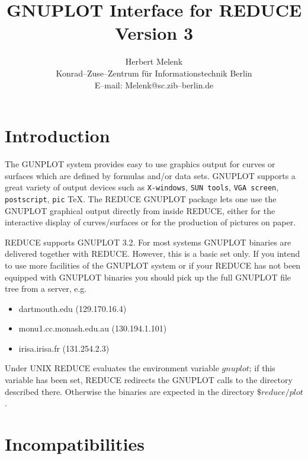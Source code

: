 \date{}
\title{GNUPLOT Interface for REDUCE\\Version 3}
\author{Herbert Melenk \\ 
Konrad--Zuse--Zentrum f\"ur Informationstechnik Berlin \\
E--mail: Melenk@sc.zib--berlin.de}

\maketitle

 
\section{Introduction}
The GUNPLOT system provides easy to use graphics output 
for curves or surfaces which are defined by  
formulas and/or data sets. GNUPLOT supports 
a great variety of output devices
such as \verb+X-windows+, \verb+SUN tools+, 
\verb+VGA screen+, \verb+postscript+, \verb+pic+ \TeX.
The {\small REDUCE} GNUPLOT package lets one use the GNUPLOT
graphical output directly from inside {\small REDUCE}, either for
the interactive display of curves/surfaces or for the production
of pictures on paper. 

{\small REDUCE} supports GNUPLOT 3.2. For most systems GNUPLOT binaries
are delivered together with {\small REDUCE}. However, this is a
basic set only. If you intend to use more facilities of the GNUPLOT
system or if your {\small REDUCE} has not been equipped with 
GNUPLOT binaries you should pick up the full GNUPLOT file tree
from a server, e.g.

\begin{itemize}
\item dartmouth.edu (129.170.16.4)
\item monu1.cc.monash.edu.au (130.194.1.101)
\item irisa.irisa.fr (131.254.2.3)
\end{itemize}

Under UNIX {\small REDUCE} evaluates the environment variable
$gnuplot$; if this variable has been set, {\small REDUCE} redirects
the GNUPLOT calls to the directory described there. Otherwise the
binaries are expected in the directory $\$reduce/plot$.

\section{Incompatibilities}

